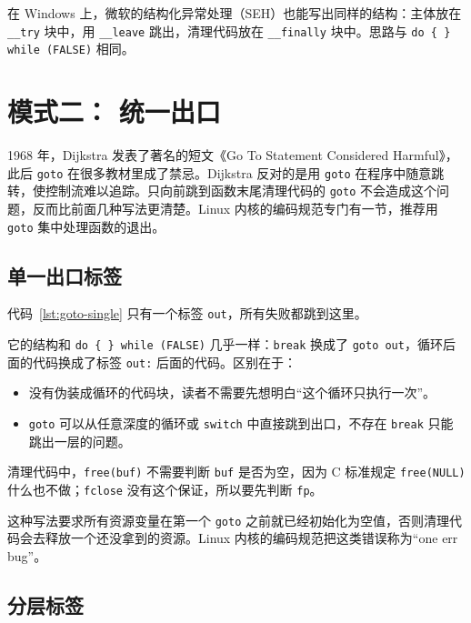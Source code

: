 在 Windows 上，微软的结构化异常处理（SEH）也能写出同样的结构：主体放在 \texttt{\_\_try} 块中，用 \texttt{\_\_leave} 跳出，清理代码放在 \texttt{\_\_finally} 块中。思路与 \texttt{do \{ \} while (FALSE)} 相同。

\section{模式二：\texorpdfstring{}{goto} 统一出口}
\label{sec:goto}

1968 年，Dijkstra 发表了著名的短文《Go To Statement Considered Harmful》\cite{dijkstra1968}，此后 \texttt{goto} 在很多教材里成了禁忌。Dijkstra 反对的是用 \texttt{goto} 在程序中随意跳转，使控制流难以追踪。只向前跳到函数末尾清理代码的 \texttt{goto} 不会造成这个问题，反而比前面几种写法更清楚。Linux 内核的编码规范专门有一节，推荐用 \texttt{goto} 集中处理函数的退出\cite{linux-coding-style}。

\subsection{单一出口标签}

代码~\ref{lst:goto-single} 只有一个标签 \texttt{out}，所有失败都跳到这里。


它的结构和 \texttt{do \{ \} while (FALSE)} 几乎一样：\texttt{break} 换成了 \texttt{goto out}，循环后面的代码换成了标签 \texttt{out:} 后面的代码。区别在于：
\begin{itemize}
  \item 没有伪装成循环的代码块，读者不需要先想明白“这个循环只执行一次”。
  \item \texttt{goto} 可以从任意深度的循环或 \texttt{switch} 中直接跳到出口，不存在 \texttt{break} 只能跳出一层的问题。
\end{itemize}

清理代码中，\texttt{free(buf)} 不需要判断 \texttt{buf} 是否为空，因为 C 标准规定 \texttt{free(NULL)} 什么也不做；\texttt{fclose} 没有这个保证，所以要先判断 \texttt{fp}。

这种写法要求所有资源变量在第一个 \texttt{goto} 之前就已经初始化为空值，否则清理代码会去释放一个还没拿到的资源。Linux 内核的编码规范把这类错误称为“one err bug”\cite{linux-coding-style}。

\subsection{分层标签}

